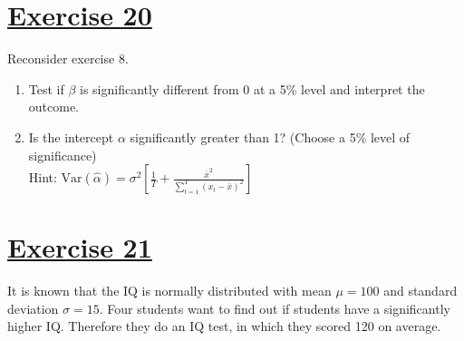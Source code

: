 \documentclass[captions=tableheading, 12pt, headings=small, parskip=half]{scrartcl}
\begin{document}
\section*{\underline{Exercise 20}}
Reconsider exercise 8.
\begin{enumerate}[label = \alph*)]
	\item Test if $\beta$ is significantly different from 0 at a 5\% level and interpret the outcome.
	\item Is the intercept $\alpha$ significantly greater than 1? (Choose a 5\% level of significance)\\
	Hint: $\text{Var}\left(\hat{\alpha}\right) = \sigma^2\left[\frac{1}{T} + \frac{\bar{x}^2}{\sum_{t = 1}^T{(x_t - \bar{x})^2}}\right]$
\end{enumerate}

\section*{\underline{Exercise 21}}
It is known that the IQ is normally distributed with mean $\mu = 100$ and standard deviation $\sigma = 15$. Four students want to find out if students have a significantly higher IQ. Therefore they do an IQ test, in which they scored 120 on average. 
\end{document}
